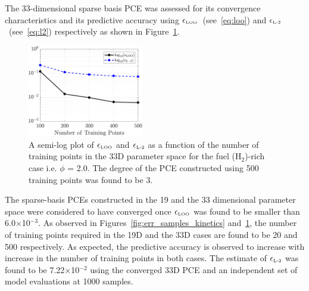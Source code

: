 {The 33-dimensional sparse basis PCE was assessed for its convergence characteristics
and its predictive accuracy using $\epsilon_{\mbox{\tiny LOO}}$~(see~\eqref{eq:loo}) and
$\epsilon_{\mbox{\tiny{L-2}}}$~(see~\eqref{eq:l2}) respectively as shown in
Figure~\ref{fig:err_samples}.  
%
\begin{figure}[htbp]
 \begin{center}
  \includegraphics[width=0.45\textwidth]{./Figures/err_samples_kinetics33D}
\caption{A semi-log plot of $\epsilon_\text{\tiny LOO}$  and $\epsilon_{\mbox{\tiny{L-2}}}$
as a function of the number of training points in the 33D parameter space 
for the fuel (H$_2$)-rich case i.e. $\phi$ = 2.0. The degree of
the PCE constructed using 500 training points was found to be 3.}
\label{fig:err_samples}
\end{center}
\end{figure}
%
The sparse-basis PCEs constructed in the 19 and the 33 dimensional parameter
space were considered to have converged once $\epsilon_\text{\tiny LOO}$ was found to be
smaller than 6.0$\times$10$^{-3}$. As observed in Figures~\ref{fig:err_samples_kinetics}
and~\ref{fig:err_samples}, the number of training points required in the 19D
and the 33D cases are found to be 20 and 500 respectively. As expected, the predictive
accuracy is observed to increase with increase in the number of training points in both cases.
The estimate of $\epsilon_{\mbox{\tiny{L-2}}}$ was found to be 7.22$\times$10$^{-2}$ using the
converged 33D PCE and an independent set of model evaluations at 1000 samples.

}
